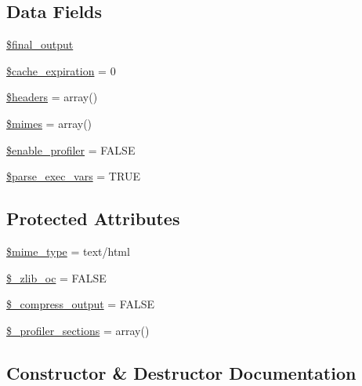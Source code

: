 \subsection*{Data Fields}
\begin{DoxyCompactItemize}
\item 
\hyperlink{class_c_i___output_aa1b5049c03b9ef373af010aa3cda17a3}{\$final\+\_\+output}
\item 
\hyperlink{class_c_i___output_a4a65b5005fdb96d5bdac5d642a022f16}{\$cache\+\_\+expiration} = 0
\item 
\hyperlink{class_c_i___output_a52500036ee807241b8b4b7e2367c49ef}{\$headers} = array()
\item 
\hyperlink{class_c_i___output_a2ce7d338d1fd0f0d971ba6213ac298a2}{\$mimes} = array()
\item 
\hyperlink{class_c_i___output_a85f3ab9485440090efd4e0ae9a070747}{\$enable\+\_\+profiler} = F\+A\+L\+S\+E
\item 
\hyperlink{class_c_i___output_a254d73d122352494697cdba0c509086d}{\$parse\+\_\+exec\+\_\+vars} = T\+R\+U\+E
\end{DoxyCompactItemize}
\subsection*{Protected Attributes}
\begin{DoxyCompactItemize}
\item 
\hyperlink{class_c_i___output_a4d1985caafb49b059e3ca3dedfee257a}{\$mime\+\_\+type} = \textquotesingle{}text/html\textquotesingle{}
\item 
\hyperlink{class_c_i___output_a76d91b71069ec82a31b4d12643e0ca40}{\$\+\_\+zlib\+\_\+oc} = F\+A\+L\+S\+E
\item 
\hyperlink{class_c_i___output_a9b8f5f282f8cf7b10d1b03b219df1386}{\$\+\_\+compress\+\_\+output} = F\+A\+L\+S\+E
\item 
\hyperlink{class_c_i___output_a4d239124375bbbdb9a4f5a0260505c40}{\$\+\_\+profiler\+\_\+sections} = array()
\end{DoxyCompactItemize}


\subsection{Constructor \& Destructor Documentation}
\hypertarget{class_c_i___output_a095c5d389db211932136b53f25f39685}{}
